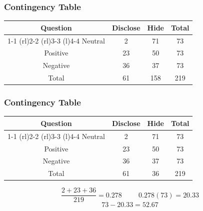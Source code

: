 \documentclass{beamer}
\begin{document}
\begin{frame}
  \frametitle{Contingency Table}
  \begin{table}
    \begin{tabular}{@{}cccc@{}}
      \toprule
      Question & Disclose & Hide & Total \\
      \cmidrule(r){1-1} \cmidrule(rl){2-2} \cmidrule(rl){3-3}
      \cmidrule(l){4-4}
      Neutral & 2 & 71 & 73 \\[0.3em]
      Positive & 23 & 50 & 73 \\[0.3em]
      Negative & 36 & 37 & 73 \\
      Total & 61 & 158 & 219 \\
      \bottomrule
    \end{tabular}
  \end{table}
\end{frame}

\begin{frame}
  \frametitle{Contingency Table}
  \begin{table}
    \begin{tabular}{@{}cccc@{}}
      \toprule
      Question & Disclose & Hide & Total \\
      \cmidrule(r){1-1} \cmidrule(rl){2-2} \cmidrule(rl){3-3}
      \cmidrule(l){4-4}
      Neutral & 2 & 71 & 73 \\[0.3em]
      Positive & 23 & 50 & 73 \\[0.3em]
      Negative & 36 & 37 & 73 \\
      Total & 61 & 36 & 219 \\
      \bottomrule
    \end{tabular}
  \end{table}
  \begin{equation*}
    \frac{2 + 23 + 36}{219} = 0.278 \hspace{1cm} 0.278(73) = 20.33
  \end{equation*}
  \begin{equation*}
    73 - 20.33 = 52.67 
  \end{equation*}
\end{frame}
\end{document}
